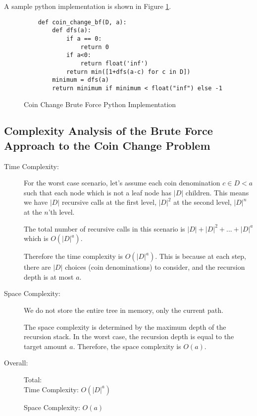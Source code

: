 
A sample python implementation is shown in Figure \ref{fig:coin-change-bf}.

\begin{figure}[h]
    \centering
    \begin{lstlisting}
    def coin_change_bf(D, a):
        def dfs(a):
            if a == 0:
                return 0
            if a<0:
                return float('inf')
            return min([1+dfs(a-c) for c in D])
        minimum = dfs(a)
        return minimum if minimum < float("inf") else -1
    \end{lstlisting}
    \caption{Coin Change Brute Force Python Implementation}
    \label{fig:coin-change-bf}
\end{figure}

\subsection{Complexity Analysis of the Brute Force Approach to the Coin Change Problem}

\begin{description}
    \item[Time Complexity:]
    For the worst case scenario, let's assume each coin denomination $c \in D < a$ such that each node which is not a leaf node has $|D|$ children. This means we have $|D|$ recursive calls at the first level, $|D|^{2}$ at the second level, $|D|^{n}$ at the $n$'th level.

    The total number of recursive calls in this scenario is $|D| + |D|^{2} + ... + |D|^{a}$ which is $O(|D|^a)$.
    
    Therefore the time complexity is $O(|D|^{a})$. This is because at each step, there are $|D|$ choices (coin denominations) to consider, and the recursion depth is at most $a$.
    
        
    \item[Space Complexity:] 
        We do not store the entire tree in memory, only the current path.

        The space complexity is determined by the maximum depth of the recursion stack. In the worst case, the recursion depth is equal to the target amount $a$. Therefore, the space complexity is $O(a)$.
        
        
    \item[Overall:] Total:\\
        Time Complexity: $O(|D|^a)$

        Space Complexity: $O(a)$
        
\end{description}

